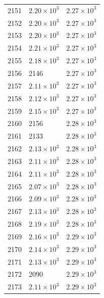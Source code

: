 \begin{table}[H]
\begin{tabular}{lll}
2151 & $\displaystyle 2.20 \times 10^{3}$ & $\displaystyle 2.27 \times 10^{3}$ \\
2152 & $\displaystyle 2.20 \times 10^{3}$ & $\displaystyle 2.27 \times 10^{3}$ \\
2153 & $\displaystyle 2.20 \times 10^{3}$ & $\displaystyle 2.27 \times 10^{3}$ \\
2154 & $\displaystyle 2.21 \times 10^{3}$ & $\displaystyle 2.27 \times 10^{3}$ \\
2155 & $\displaystyle 2.18 \times 10^{3}$ & $\displaystyle 2.27 \times 10^{3}$ \\
2156 & 2146 & $\displaystyle 2.27 \times 10^{3}$ \\
2157 & $\displaystyle 2.11 \times 10^{3}$ & $\displaystyle 2.27 \times 10^{3}$ \\
2158 & $\displaystyle 2.12 \times 10^{3}$ & $\displaystyle 2.27 \times 10^{3}$ \\
2159 & $\displaystyle 2.15 \times 10^{3}$ & $\displaystyle 2.27 \times 10^{3}$ \\
2160 & 2156 & $\displaystyle 2.28 \times 10^{3}$ \\
2161 & 2133 & $\displaystyle 2.28 \times 10^{3}$ \\
2162 & $\displaystyle 2.13 \times 10^{3}$ & $\displaystyle 2.28 \times 10^{3}$ \\
2163 & $\displaystyle 2.11 \times 10^{3}$ & $\displaystyle 2.28 \times 10^{3}$ \\
2164 & $\displaystyle 2.11 \times 10^{3}$ & $\displaystyle 2.28 \times 10^{3}$ \\
2165 & $\displaystyle 2.07 \times 10^{3}$ & $\displaystyle 2.28 \times 10^{3}$ \\
2166 & $\displaystyle 2.09 \times 10^{3}$ & $\displaystyle 2.28 \times 10^{3}$ \\
2167 & $\displaystyle 2.13 \times 10^{3}$ & $\displaystyle 2.28 \times 10^{3}$ \\
2168 & $\displaystyle 2.19 \times 10^{3}$ & $\displaystyle 2.28 \times 10^{3}$ \\
2169 & $\displaystyle 2.16 \times 10^{3}$ & $\displaystyle 2.29 \times 10^{3}$ \\
2170 & $\displaystyle 2.14 \times 10^{3}$ & $\displaystyle 2.29 \times 10^{3}$ \\
2171 & $\displaystyle 2.13 \times 10^{3}$ & $\displaystyle 2.29 \times 10^{3}$ \\
2172 & 2090 & $\displaystyle 2.29 \times 10^{3}$ \\
2173 & $\displaystyle 2.11 \times 10^{3}$ & $\displaystyle 2.29 \times 10^{3}$ \\

\end{tabular}
\end{table}
